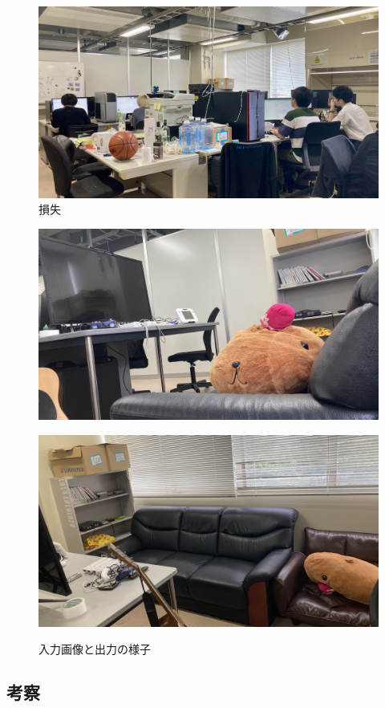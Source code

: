 \begin{figure}[htbp]
    \centering
    \includegraphics[width=.5\textwidth]{figure/labpic.jpg} %
    \caption{損失} %
    \label{fig:LossGraph} %
\end{figure}

\begin{figure}[H]
	\begin{minipage}{.5\textwidth}
        \centering
		\includegraphics[width=.95\textwidth]{figure/labpic_game.jpg}
        \label{fig:Result_1}
	\end{minipage}\hfill
 	\begin{minipage}{.5\textwidth}
        \centering
		\includegraphics[width=.95\textwidth]{figure/labpic_sofa.jpg}
        \label{fig:Result_2}
	\end{minipage}\hfill
	\caption{入力画像と出力の様子}\label{fig:Result}
\end{figure}


\subsection{考察}\label{sec:Ex_consideration}
